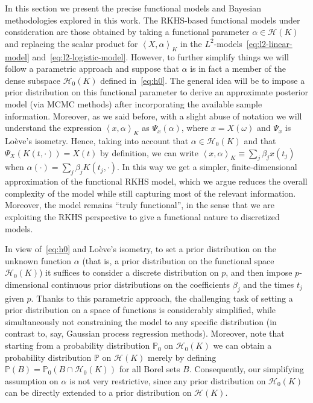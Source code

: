 \documentclass{article}
\numberwithin{equation}{section}
\theoremstyle{plain}
\newcommand{\Hcal}{\mathcal{H}}
\newcommand\dotprod[2]{\left\langle#1,#2\right\rangle}
\begin{document}
In this section we present the precise functional models and Bayesian methodologies explored in this work. The RKHS-based functional models under consideration are those obtained by taking a functional parameter \(\alpha \in \Hcal(K)\) and replacing the scalar product for \(\dotprod{X}{\alpha}_K\) in the \(L^2\)-models~\eqref{eq:l2-linear-model} and~\eqref{eq:l2-logistic-model}. However, to further simplify things we will follow a parametric approach and suppose that \(\alpha\) is in fact a member of the dense subspace \(\Hcal_0(K)\) defined in~\eqref{eq:h0}. The general idea will be to impose a prior distribution on this functional parameter to derive an approximate posterior model (via MCMC methods) after incorporating the available sample information.  Moreover, as we said before, with a slight abuse of notation we will understand the expression \(\dotprod{x}{\alpha}_K\) as \(\Psi_x(\alpha)\), where \(x=X(\omega)\) and \(\Psi_x\) is Loève's isometry. Hence, taking into account that \(\alpha \in \Hcal_{0}(K)\) and that \(\Psi_X(K(t, \cdot)) = X(t)\) by definition, we can write \(\dotprod{x}{\alpha}_K \equiv \sum_j \beta_j x(t_j)\) when \(\alpha(\cdot)=\sum_j\beta_j K(t_j, \cdot)\). In this way we get a simpler, finite-dimensional approximation of the functional RKHS model, which we argue reduces the overall complexity of the model while still capturing most of the relevant information. Moreover, the model remains ``truly functional'', in the sense that we are exploiting the RKHS perspective to give a functional nature to discretized models.

In view of~\eqref{eq:h0} and Loève's isometry, to set a prior distribution on the unknown function \(\alpha\) (that is, a prior distribution on the functional space \(\Hcal_{0}(K)\)) it suffices to consider a discrete distribution on \(p\), and then impose \(p\)-dimensional continuous prior distributions on the coefficients \(\beta_j\) and the times \(t_j\) given \(p\). Thanks to this parametric approach, the challenging task of setting a prior distribution on a space of functions is considerably simplified, while simultaneously not constraining the model to any specific distribution (in contrast to, say, Gaussian process regression methods). Moreover, note that starting from a probability distribution \(\mathbb{P}_0\) on \(\Hcal_0(K)\) we can obtain a probability distribution \(\mathbb{P}\) on \(\Hcal(K)\) merely by defining \(\mathbb{P}(B) = \mathbb{P}_0(B\cap \Hcal_0(K))\) for all Borel sets \(B\). Consequently, our simplifying assumption on \(\alpha\) is not very restrictive, since any prior distribution on \(\Hcal_0(K)\) can be directly extended to a prior distribution on \(\Hcal(K)\).
\end{document}
